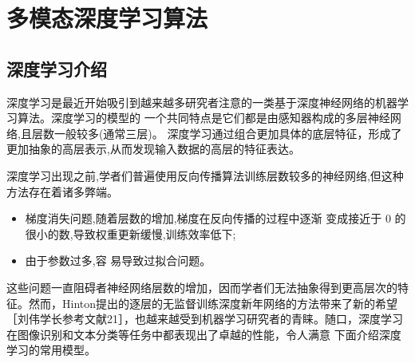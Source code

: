 
\chapter{多模态深度学习算法}
\label{chap:chap6}

\section{深度学习介绍}
	深度学习是最近开始吸引到越来越多研究者注意的一类基于深度神经网络的机器学习算法。深度学习的模型的 一个共同特点是它们都是由感知器构成的多层神经网络,且层数一般较多(通常三层)。 深度学习通过组合更加具体的底层特征，形成了更加抽象的高层表示,从而发现输入数据的高层的特征表达。
	
	深度学习出现之前,学者们普遍使用反向传播算法训练层数较多的神经网络,但这种方法存在着诸多弊端。
	\begin{itemize}
		\item 梯度消失问题,随着层数的增加,梯度在反向传播的过程中逐渐 变成接近于 0 的很小的数,导致权重更新缓慢,训练效率低下;
		\item 由于参数过多,容 易导致过拟合问题。
	\end{itemize}
	
	这些问题一直阻碍者神经网络层数的增加，因而学者们无法抽象得到更高层次的特征。然而，Hinton提出的逐层的无监督训练深度新年网络的方法带来了新的希望［刘伟学长参考文献21］，也越来越受到机器学习研究者的青睐。随口，深度学习在图像识别和文本分类等任务中都表现出了卓越的性能，令人满意 下面介绍深度学习的常用模型。
